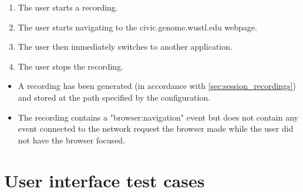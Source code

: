 \begin{tests}
    {\begin{enumerate}
        \item The \gls{user} starts a recording.
        \item The \gls{user} starts navigating to the civic.genome.wustl.edu webpage.
        \item The \gls{user} then immediately switches to another application.
        \item The \gls{user} stops the recording.
    \end{enumerate}}
    {\begin{itemize}
        \item A recording has been generated (in accordance with \ref{sec:session_recordings}) and stored at the path specified by the configuration.
        \item The recording contains a "browser:navigation" event but does not contain any event connected to the network request the browser made while the \gls{user} did not have the browser focused.
    \end{itemize}}
\end{tests}

\section{User interface test cases}

